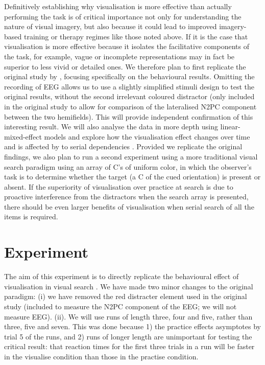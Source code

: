 \documentclass[smallextended]{svjour3}       %
\begin{document}
Definitively establishing why visualisation is more effective than actually performing the task is of critical importance not only for understanding the nature of visual imagery, but also because it could lead to improved imagery-based training or therapy regimes like those noted above. If it is the case that visualisation is more effective because it isolates the facilitative components of the task, for example, vague or incomplete representations may in fact be superior to less vivid or detailed ones. We therefore plan to first replicate the original study by \cite{reinhart2015}, focusing specifically on the behavioural results. Omitting the recording of EEG allows us to use a slightly simplified stimuli design to test the original results, without the second irrelevant coloured distractor (only included in the original study to allow for comparison of the lateralised N2PC component between the two hemifields). This will provide independent confirmation of this interesting result. We will also analyse the data in more depth using linear-mixed-effect models and explore how the visualisation effect changes over time and is affected by to serial dependencies \citep{fischer-whitney2014}. Provided we replicate the original findings, we also plan to run a second experiment using a more traditional visual search paradigm using an array of C's of uniform color, in which the observer's task is to determine whether the target (a C of the cued orientation) is present or absent. If the superiority of visualisation over practice at search is due to proactive interference from the distractors when the search array is presented, there should be even larger benefits of visualisation when serial search of all the items is required.  

\section{Experiment}
\label{sec:exp1}

The aim of this experiment is to directly replicate the behavioural effect of visualisation in visual search \citep{reinhart2015}. We have made two minor changes to the original paradigm: (i) we have removed the red distracter element used in the original study (included to measure the N2PC component of the EEG; we will not measure EEG). (ii). We will use runs of length three, four and five, rather than three, five and seven. This was done because 1) the practice effects asymptotes by trial 5 of the runs, and 2) runs of longer length are unimportant for testing the critical result: that reaction times for the first three trials in a run will be faster in the visualise condition than those in the practise condition. 
\end{document}
